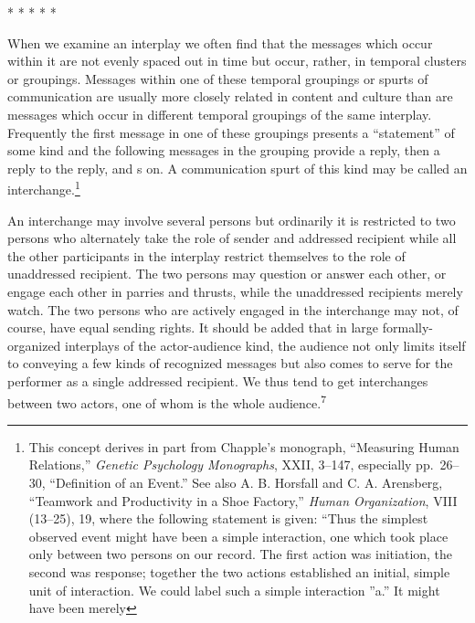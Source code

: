 \documentclass[twoside,symmetric,nobib,justified]{tufte-book}
\begin{document}
\vspace{.2in}
\begin{centering}

\Large{* * * * *}

\end{centering}
\vspace{.17in}

\noindent When we examine an interplay we often find that the messages which occur
within it are not evenly spaced out in time but occur, rather, in
temporal clusters or groupings. Messages within one of these temporal
groupings or spurts of communication are usually more closely related in
content and culture than are messages which occur in different temporal
groupings of the same interplay. Frequently the first message in one of
these groupings presents a ``statement'' of some kind and the following
messages in the grouping provide a reply, then a reply to the reply, and
s on. A communication spurt of this kind may be called an
interchange.\footnote{This concept derives in part from Chapple's
  monograph, ``Measuring Human Relations,'' \emph{Genetic Psychology
  Monographs}, XXII, 3--147, especially pp.~26--30, ``Definition of an
  Event.'' See also A. B. Horsfall and C. A. Arensberg, ``Teamwork and
  Productivity in a Shoe Factory,'' \emph{Human Organization}, VIII
  (13--25), 19, where the following statement is given: ``Thus the
  simplest observed event might have been a simple interaction, one
  which took place only between two persons on our record. The first
  action was initiation, the second was response; together the two
  actions established an initial, simple unit of interaction. We could
  label such a simple interaction ''a.'' It might have been merely}

An interchange may involve several persons but ordinarily it is
restricted to two persons who alternately take the role of sender and
addressed recipient while all the other participants in the interplay
restrict themselves to the role of unaddressed recipient. The two
persons may question or answer each other, or engage each other in
parries and thrusts, while the unaddressed recipients merely watch. The
two persons who are actively engaged in the interchange may not, of
course, have equal sending rights. It should be added that in large
formally-organized interplays of the actor-audience kind, the audience
not only limits itself to conveying a few kinds of recognized messages
but also comes to serve for the performer as a single addressed
recipient. We thus tend to get interchanges between two actors, one of
whom is the whole audience.\textsuperscript{7}
\end{document}

